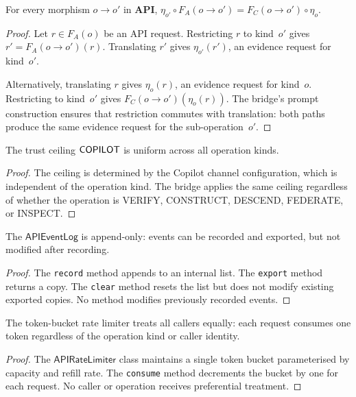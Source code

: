 \documentclass[11pt]{article}
\newcommand{\APILog}{\mathsf{APIEventLog}}
\newcommand{\APIRate}{\mathsf{APIRateLimiter}}
\begin{document}
\begin{lemma}%
\label{lem:bridgenaturality}
For every morphism $o \to o'$ in $\mathbf{API}$,
$\eta_{o'} \circ F_A(o \to o') = F_C(o \to o') \circ \eta_o$.
\end{lemma}
\begin{proof}
Let $r \in F_A(o)$ be an API request.  Restricting $r$ to
kind~$o'$ gives $r' = F_A(o \to o')(r)$.  Translating $r'$
gives $\eta_{o'}(r')$, an evidence request for kind~$o'$.

Alternatively, translating $r$ gives $\eta_o(r)$, an
evidence request for kind~$o$.  Restricting to kind~$o'$
gives $F_C(o \to o')(\eta_o(r))$.  The bridge's prompt
construction ensures that restriction commutes with
translation: both paths produce the same evidence request
for the sub-operation~$o'$.
\end{proof}

\begin{lemma}%
\label{lem:trustnatbound}
The trust ceiling $\mathsf{COPILOT}$ is uniform across all
operation kinds.
\end{lemma}
\begin{proof}
The ceiling is determined by the Copilot channel
configuration, which is independent of the operation kind.
The bridge applies the same ceiling regardless of whether
the operation is VERIFY, CONSTRUCT, DESCEND, FEDERATE, or
INSPECT.
\end{proof}

\begin{lemma}%
\label{lem:logappend}
The $\APILog$ is append-only: events can be recorded and
exported, but not modified after recording.
\end{lemma}
\begin{proof}
The \texttt{record} method appends to an internal list.
The \texttt{export} method returns a copy.  The
\texttt{clear} method resets the list but does not modify
existing exported copies.  No method modifies previously
recorded events.
\end{proof}

\begin{lemma}\label{lem:ratefair}
The token-bucket rate limiter treats all callers equally:
each request consumes one token regardless of the operation
kind or caller identity.
\end{lemma}
\begin{proof}
The $\APIRate$ class maintains a single token bucket
parameterised by capacity and refill rate.  The
\texttt{consume} method decrements the bucket by one for
each request.  No caller or operation receives preferential
treatment.
\end{proof}
\end{document}
